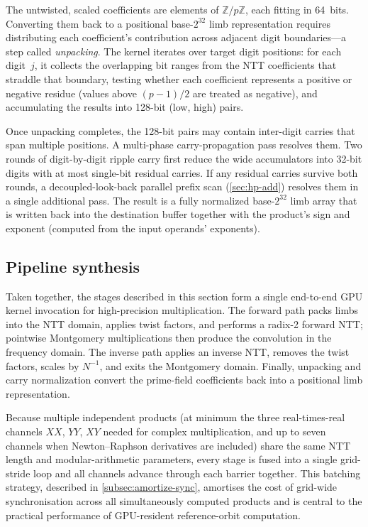The untwisted, scaled coefficients are elements of $\mathbb{Z}/p\mathbb{Z}$,
each fitting in 64~bits.  Converting them back to a positional
base-$2^{32}$ limb representation requires distributing each
coefficient's contribution across adjacent digit boundaries---a step
called \emph{unpacking}.  The kernel 
iterates over target digit positions: for each digit~$j$, it collects the
overlapping bit ranges from the NTT coefficients that straddle that
boundary, testing whether each coefficient represents a positive or
negative residue (values above $(p-1)/2$ are treated as negative),
and accumulating the results into 128-bit (low, high) pairs.

Once unpacking completes, the 128-bit pairs may contain inter-digit
carries that span multiple positions.  A multi-phase carry-propagation
pass resolves them.  Two rounds of digit-by-digit ripple carry first
reduce the wide accumulators into 32-bit digits with at most single-bit
residual carries.  If any residual carries survive both rounds, a
decoupled-look-back parallel prefix scan
(\cref{sec:hp-add}) resolves them in a single
additional pass.  The result is a fully normalized base-$2^{32}$ limb
array that is written back into the destination 
buffer together with the product's sign and exponent (computed from the
input operands' exponents).

\subsection{Pipeline synthesis}
\label{subsec:ntt-pipeline-synthesis}

Taken together, the stages described in this section form a single
end-to-end GPU kernel invocation for high-precision multiplication.
The forward path packs limbs into the NTT domain, applies twist
factors, and performs a radix-2 forward NTT; pointwise Montgomery
multiplications then produce the convolution in the frequency domain.
The inverse path applies an inverse NTT, removes the twist factors,
scales by $N^{-1}$, and exits the Montgomery domain.  Finally,
unpacking and carry normalization convert the prime-field
coefficients back into a positional limb representation.

Because multiple independent products (at minimum the three real-times-real
channels $XX$, $YY$, $XY$ needed for complex multiplication, and up to
seven channels when Newton--Raphson derivatives are included) share the
same NTT length and modular-arithmetic parameters, every stage is
fused into a single grid-stride loop and all channels advance through
each barrier together.  This batching strategy, described in
\cref{subsec:amortize-sync}, amortises the cost of grid-wide
synchronisation across all simultaneously computed products and is
central to the practical performance of GPU-resident reference-orbit
computation.

